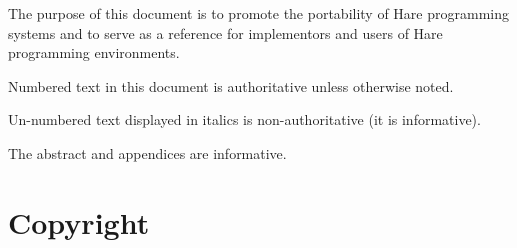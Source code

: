 
\specitem
The purpose of this document is to promote the portability of Hare programming
systems and to serve as a reference for implementors and users of Hare
programming environments.

\specitem
Numbered text in this document is authoritative unless otherwise noted.

\specitem
Un-numbered text displayed in italics is non-authoritative (it is informative).


\specitem
The abstract and appendices are informative.

\section{Copyright}

